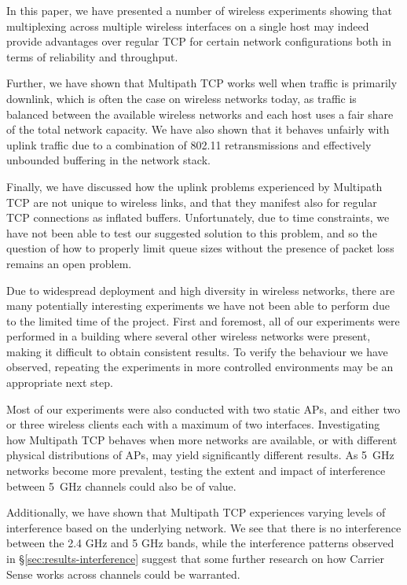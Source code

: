 In this paper, we have presented a number of wireless experiments showing that
multiplexing across multiple wireless interfaces on a single host may indeed
provide advantages over regular TCP for certain network
configurations both in terms of reliability and throughput.

Further, we have shown that Multipath TCP works well when traffic is
primarily downlink, which is often the case on wireless networks today, as 
traffic is balanced between the available wireless networks and each host
uses a fair share of the total network capacity. We have also shown that 
it behaves unfairly with uplink traffic due to a combination of 
802.11 retransmissions and effectively unbounded buffering in the network stack.

Finally, we have discussed how the uplink problems experienced by Multipath TCP
are not unique to wireless links, and that they manifest also for regular TCP
connections as inflated buffers. Unfortunately, due to time constraints, we have 
not been able to test our suggested solution to this problem, and so the 
question of how to properly limit queue sizes without the presence of packet loss 
remains an open problem.

Due to widespread deployment and high diversity in wireless networks, there
are many potentially interesting experiments we have not been able to perform due to
the limited time of the project. First and foremost, all of our experiments were 
performed in a building where several other wireless networks were present, 
making it difficult to obtain consistent results. To verify the behaviour we 
have observed, repeating the experiments in more controlled environments may be 
an appropriate next step.

Most of our experiments were also conducted with two static APs, and either two 
or three wireless clients each with a maximum of two interfaces. Investigating 
how Multipath TCP behaves when more networks are available, or with different 
physical distributions of APs, may yield significantly different results. 
As 5~GHz networks become more prevalent, testing the extent and impact of interference 
between 5~GHz channels could also be of value. 

Additionally, we have shown that Multipath TCP experiences varying levels of 
interference based on the underlying network. We see that there is no 
interference between the 2.4 GHz and 5 GHz bands, while the interference patterns 
observed in \S\ref{sec:results-interference} suggest that some further research 
on how Carrier Sense works across channels could be warranted.

